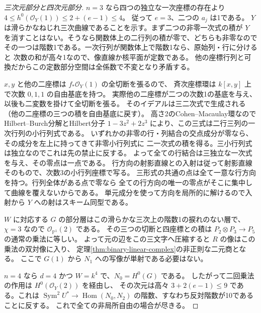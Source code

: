 \begin{proof}[三次元部分と四次元部分]
$n=3$ なら四つの独立な一次座標の存在より $4\le h^0(\mathcal O_Y(1))\le2+(e-1)\le4$。
従って $e=3$、二つの $a_j$ は1である。
$Y$ は滑らかなねじれ三次曲線であることを示す。まず二つの非零一次式の積が
$Y$ を消すことはない。そうなら関数体上の二行列の積が零で、どちらも非零なので
その一つは階数1である。一次行列が関数体上で階数1なら、原始列・行に分けると
次数の和が高々1なので、像直線か核平面が定数である。
他の座標行列と可換だからこの定数部分空間は全係数で不変となり矛盾する。

$x,y$ と他の二座標は $f_*\mathcal O_Y(1)$ の全切断を張るので、
斉次座標環は $k[x,y]$ 上で次数 $0,1,1$ の自由基底を持つ。
実際他の二座標が二つの次数1の基底を与え、以後も二変数を掛けて全切断を張る。
そのイデアルは三二次式で生成される（他の二座標の三つの積を自由基底に戻す）。
高さ2のCohen--Macaulay環なのでHilbert--Burch分解とHilbert分子
$1-3z^2+2z^3$ により、この三式は二行三列の一次行列の小行列式である。
いずれかの非零の行・列結合の交点成分が零なら、その成分を左上に持ってきて非零小行列式に
二一次式の積を得る。三小行列式は独立なのでこれは先の禁止に反する。
よって全ての行結合は三独立な一次式を与え、その零点は一点である。
行方向の射影直線との入射は従って射影直線そのもので、次数3の小行列座標で写る。
三形式の共通の点は全て一意な行方向を持つ。行列全体がある点で零なら
全ての行方向の唯一の零点がそこに集中して曲線を覆えないからである。
単元成分を使って方向を局所的に解けるので入射から $Y$ への射はスキーム同型である。

$W$ に対応する $G$ の部分層はこの滑らかな三次上の階数1の捩れのない層で、
$\chi=3$ なので $\mathcal O_{\mathbb P^1}(2)$ である。
その三つの切断と四座標との積は $P_2\otimes P_3\to P_5$ の通常の乗法に等しい。
よって元の辺をこの三文字へ圧縮すると $R$ の像はこの乗法の双対像に入り、
定理\ref{thm:binary-linear-complex}の非正則な二元商となる。
ここで $G(1)$ から $N_1$ への写像が単射である必要はない。

$n=4$ なら $d=4$ かつ $W=k^4$ で、$N_0=H^0(G)$ である。
したがって二回乗法の作用は $H^0(\mathcal O_Y(2))$ を経由し、
その次元は高々 $3+2(e-1)\le9$ である。これは $\operatorname{Sym}^2 U^*\to
\operatorname{Hom}(N_0,N_2)$ の階数、すなわち反対階数が10であることに反する。
これで全ての非局所自由の場合が尽きる。
\end{proof}
